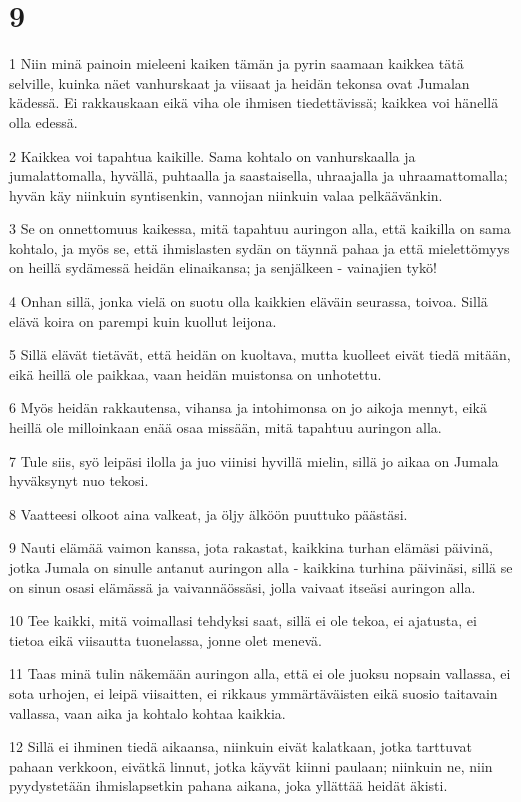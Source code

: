 \chapter{9}

\par 1 Niin minä painoin mieleeni kaiken tämän ja pyrin saamaan kaikkea tätä selville, kuinka näet vanhurskaat ja viisaat ja heidän tekonsa ovat Jumalan kädessä. Ei rakkauskaan eikä viha ole ihmisen tiedettävissä; kaikkea voi hänellä olla edessä.
\par 2 Kaikkea voi tapahtua kaikille. Sama kohtalo on vanhurskaalla ja jumalattomalla, hyvällä, puhtaalla ja saastaisella, uhraajalla ja uhraamattomalla; hyvän käy niinkuin syntisenkin, vannojan niinkuin valaa pelkäävänkin.
\par 3 Se on onnettomuus kaikessa, mitä tapahtuu auringon alla, että kaikilla on sama kohtalo, ja myös se, että ihmislasten sydän on täynnä pahaa ja että mielettömyys on heillä sydämessä heidän elinaikansa; ja senjälkeen - vainajien tykö!
\par 4 Onhan sillä, jonka vielä on suotu olla kaikkien eläväin seurassa, toivoa. Sillä elävä koira on parempi kuin kuollut leijona.
\par 5 Sillä elävät tietävät, että heidän on kuoltava, mutta kuolleet eivät tiedä mitään, eikä heillä ole paikkaa, vaan heidän muistonsa on unhotettu.
\par 6 Myös heidän rakkautensa, vihansa ja intohimonsa on jo aikoja mennyt, eikä heillä ole milloinkaan enää osaa missään, mitä tapahtuu auringon alla.
\par 7 Tule siis, syö leipäsi ilolla ja juo viinisi hyvillä mielin, sillä jo aikaa on Jumala hyväksynyt nuo tekosi.
\par 8 Vaatteesi olkoot aina valkeat, ja öljy älköön puuttuko päästäsi.
\par 9 Nauti elämää vaimon kanssa, jota rakastat, kaikkina turhan elämäsi päivinä, jotka Jumala on sinulle antanut auringon alla - kaikkina turhina päivinäsi, sillä se on sinun osasi elämässä ja vaivannäössäsi, jolla vaivaat itseäsi auringon alla.
\par 10 Tee kaikki, mitä voimallasi tehdyksi saat, sillä ei ole tekoa, ei ajatusta, ei tietoa eikä viisautta tuonelassa, jonne olet menevä.
\par 11 Taas minä tulin näkemään auringon alla, että ei ole juoksu nopsain vallassa, ei sota urhojen, ei leipä viisaitten, ei rikkaus ymmärtäväisten eikä suosio taitavain vallassa, vaan aika ja kohtalo kohtaa kaikkia.
\par 12 Sillä ei ihminen tiedä aikaansa, niinkuin eivät kalatkaan, jotka tarttuvat pahaan verkkoon, eivätkä linnut, jotka käyvät kiinni paulaan; niinkuin ne, niin pyydystetään ihmislapsetkin pahana aikana, joka yllättää heidät äkisti.
